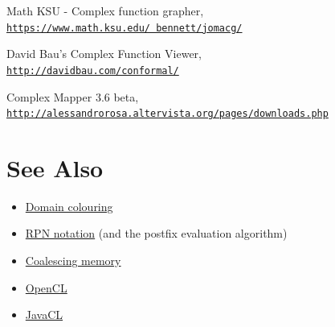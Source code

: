\documentclass{article}
\begin{document}
			\begin{thebibliography}{100}
				
				Math KSU - Complex function grapher,
				\\ \texttt{\href{https://www.math.ksu.edu/~bennett/jomacg/}{https://www.math.ksu.edu/~bennett/jomacg/}}
				
				David Bau's Complex Function Viewer,
				\\\texttt{\href{http://davidbau.com/conformal/}{http://davidbau.com/conformal/}}
				
				Complex Mapper 3.6 beta,
				\\\texttt{\href{http://alessandrorosa.altervista.org/pages/downloads.php}{http://alessandrorosa.altervista.org/pages/downloads.php}}
				
			\end{thebibliography}
	
	\section{See Also}
	
		\begin{itemize}
			\item \href{https://en.wikipedia.org/wiki/Domain_coloring}{Domain colouring}
			\item \href{https://en.wikipedia.org/wiki/Reverse_Polish_notation}{RPN notation} (and the postfix evaluation algorithm)
			\item \href{https://devblogs.nvidia.com/how-access-global-memory-efficiently-cuda-c-kernels/}{Coalescing memory}
			\item \href{https://www.khronos.org/opencl/}{OpenCL}
			\item \href{https://github.com/nativelibs4java/JavaCL}{JavaCL}
		\end{itemize}
   
\end{document}
